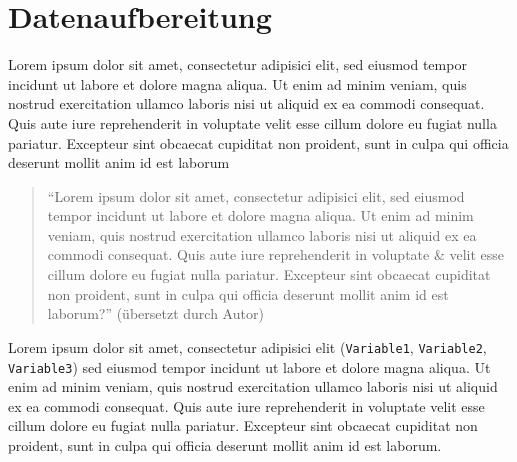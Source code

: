 \section{Datenaufbereitung}
Lorem ipsum dolor sit amet, consectetur adipisici elit, sed eiusmod tempor incidunt ut labore et dolore magna aliqua. Ut enim ad minim veniam, quis nostrud exercitation ullamco laboris nisi ut aliquid ex ea commodi consequat. Quis aute iure reprehenderit in voluptate velit esse cillum dolore eu fugiat nulla pariatur. Excepteur sint obcaecat cupiditat non proident, sunt in culpa qui officia deserunt mollit anim id est laborum
%
\begin{quote}
"`Lorem ipsum dolor sit amet, consectetur adipisici elit, sed eiusmod tempor incidunt ut labore et dolore magna aliqua. Ut enim ad minim veniam, quis nostrud exercitation ullamco laboris nisi ut aliquid ex ea commodi consequat. Quis aute iure reprehenderit in voluptate \& velit esse cillum dolore eu fugiat nulla pariatur. Excepteur sint obcaecat cupiditat non proident, sunt in culpa qui officia deserunt mollit anim id est laborum?"' (übersetzt durch Autor)
\end{quote}
%
Lorem ipsum dolor sit amet, consectetur adipisici elit (\texttt{Variable1}, \texttt{Variable2}, \texttt{Variable3}) sed eiusmod tempor incidunt ut labore et dolore magna aliqua. Ut enim ad minim veniam, quis nostrud exercitation ullamco laboris nisi ut aliquid ex ea commodi consequat. Quis aute iure reprehenderit in voluptate velit esse cillum dolore eu fugiat nulla pariatur. Excepteur sint obcaecat cupiditat non proident, sunt in culpa qui officia deserunt mollit anim id est laborum.
\newpage
